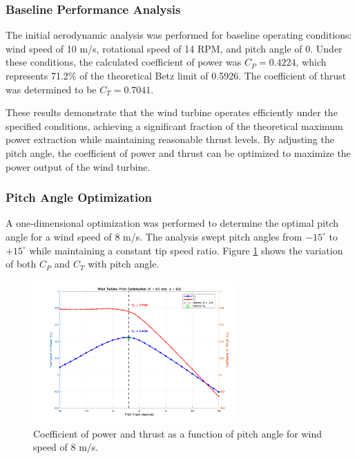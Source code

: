 \documentclass[11pt]{article}
\begin{document}
\subsubsection{Baseline Performance Analysis}

The initial aerodynamic analysis was performed for baseline operating conditions: wind speed of 10 m/s, rotational speed of 14 RPM, and pitch angle of 0\textdegree{}. Under these conditions, the calculated coefficient of power was $C_P = 0.4224$, which represents 71.2\% of the theoretical Betz limit of 0.5926. The coefficient of thrust was determined to be $C_T = 0.7041$.

These results demonstrate that the wind turbine operates efficiently under the specified conditions, achieving a significant fraction of the theoretical maximum power extraction while maintaining reasonable thrust levels. By adjusting the pitch angle, the coefficient of power and thrust can be optimized to maximize the power output of the wind turbine. 


\subsubsection{Pitch Angle Optimization}

A one-dimensional optimization was performed to determine the optimal pitch angle for a wind speed of 8 m/s. The analysis swept pitch angles from $-15^{\circ}$ to $+15^{\circ}$ while maintaining a constant tip speed ratio. Figure \ref{fig:cp_ct_vs_pitch} shows the variation of both $C_P$ and $C_T$ with pitch angle.

\begin{figure}[H]
  \centering
  \includegraphics[width=0.7\textwidth]{../../PNGS/Pitch_Optimization_Results.png}
  \caption{Coefficient of power and thrust as a function of pitch angle for wind speed of 8 m/s.}
  \label{fig:cp_ct_vs_pitch}
\end{figure}
\end{document}
